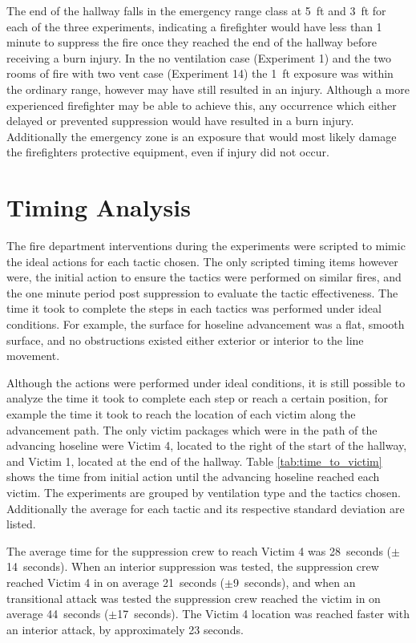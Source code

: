 \documentclass[12pt,oneside]{book}
\begin{document}
The end of the hallway falls in the emergency range class at 5~ft and 3~ft for each of the three experiments, indicating a firefighter would have less than 1 minute to suppress the fire once they reached the end of the hallway before receiving a burn injury. In the no ventilation case (Experiment 1) and the two rooms of fire with two vent case (Experiment 14) the 1~ft exposure was within the ordinary range, however may have still resulted in an injury. Although a more experienced firefighter may be able to achieve this, any occurrence which either delayed or prevented suppression would have resulted in a burn injury. Additionally the emergency zone is an exposure that would most likely damage the firefighters protective equipment, even if injury did not occur. 

\section{Timing Analysis}
The fire department interventions during the experiments were scripted to mimic the ideal actions for each tactic chosen. The only scripted timing items however were, the initial action to ensure the tactics were performed on similar fires, and the one minute period post suppression to evaluate the tactic effectiveness. The time it took to complete the steps in each tactics was performed under ideal conditions. For example, the surface for hoseline advancement was a flat, smooth surface, and no obstructions existed either exterior or interior to the line movement. 

Although the actions were performed under ideal conditions, it is still possible to analyze the time it took to complete each step or reach a certain position, for example the time it took to reach the location of each victim along the advancement path. The only victim packages which were in the path of the advancing hoseline were Victim 4, located to the right of the start of the hallway, and Victim 1, located at the end of the hallway. Table \ref{tab:time_to_victim} shows the time from initial action until the advancing hoseline reached  each victim. The experiments are grouped by ventilation type and the tactics chosen. Additionally the average for each tactic and its respective standard deviation are listed.

The average time for the suppression crew to reach Victim 4 was 28~seconds ($\pm$14~seconds). When an interior suppression was tested, the suppression crew reached Victim 4 in on average 21~seconds ($\pm$9~seconds), and when an transitional attack was tested the suppression crew reached the victim in on average 44~seconds ($\pm$17~seconds). The Victim 4 location was reached faster with an interior attack, by approximately 23 seconds. 
\end{document}
